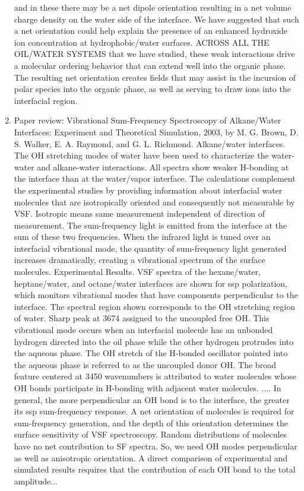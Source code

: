 \documentclass[12pt,reqno]{amsart}
\numberwithin{equation}{section}
\begin{document}
\begin{enumerate}
and in these there may be a net dipole orientation resulting in a net volume charge density on the water side of the interface.  We have suggested that such a net orientation could help explain the presence of an enhanced hydroxide ion concentration at hydrophobic/water surfaces.  ACROSS ALL THE OIL/WATER SYSTEMS that we have studied, these weak interactions drive a molecular ordering behavior that can extend well into the organic phase.  The resulting net orientation creates fields that may assist in the incursion of polar species into the organic phase, as well as serving to draw ions into the interfacial region.

\item Paper review: Vibrational Sum-Frequency Spectroscopy of Alkane/Water Interfaces: Experiment and Theoretical Simulation, 2003, by M. G. Brown, D. S. Walker, E. A. Raymond, and G. L. Richmond.  
\subitem Alkane/water interfaces.  The OH stretching modes of water have been used to characterize the water-water and alkane-water interactions.  All spectra show weaker H-bonding at the interface than at the water/vapor interface.  The calculations complement the experimental studies by providing information about interfacial water molecules that are isotropically oriented and consequently not measurable by VSF.  Isotropic means same measurement independent of direction of measurement.  The sum-frequency light is emitted from the interface at the sum of these two frequencies.  When the infrared light is tuned over an interfacial vibrational mode, the quantity of sum-frequency light generated increases dramatically, creating a vibrational spectrum of the surface molecules.  Experimental Results.  VSF spectra of the hexane/water, heptane/water, and octane/water interfaces are shown for ssp polarization, which monitors vibrational modes that have components perpendicular to the interface.  The spectral region shown corresponds to the OH stretching region of water.  Sharp peak at 3674 assigned to the uncoupled free OH.  This vibrational mode occurs when an interfacial molecule has an unbonded hydrogen directed into the oil phase while the other hydrogen protrudes into the aqueous phase.  The OH stretch of the H-bonded oscillator pointed into the aqueous phase is referred to as the uncoupled donor OH.  The broad feature centered at 3450 wavenumbers is attributed to water molecules whose OH bonds participate in H-bonding with adjacent water molecules.  .... In general, the more perpendicular an OH bond is to the interface, the greater its ssp sum-frequency response.  A net orientation of molecules is required for sum-frequency generation, and the depth of this orientation determines the surface sensitivity of VSF spectroscopy.  Random distributions of molecules have no net contribution to SF spectra.  So, we need OH modes perpendicular as well as anisotropic orientation.  A direct comparison of experimental and simulated results requires that the contribution of each OH bond to the total amplitude...

\end{enumerate}
\end{document}
